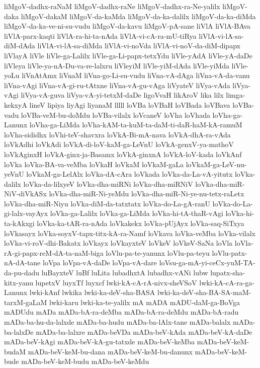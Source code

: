 {liMgoV-dadhx-raNaM
liMgoV-dadhx-raNe
liMgoV-dadhx-ra-Ne-yalilx
liMgoV-daka
liMgoV-dakaM
liMgoV-da-kaMda
liMgoV-da-ka-dalilx
liMgoV-da-ka-diMda
liMgoV-da-ka-ve-ni-su-vudu
liMgoV-da-kavu
liMgoV-pA-sane
liVlA
liVlA-BAva
liVlA-parx-kaqti
liVlA-ra-hi-ta-nAda
liVlA-vi-cA-ra-mU-tiRya
liVlA-vi-lA-sa-diM-dAda
liVlA-vi-lA-sa-diMda
liVlA-vi-noVda
liVlA-vi-noV-da-diM-dipapx
liVlayA
liVle
liVle-ga-Lalilx
liVle-ga-Li-papx-tetxYdu
liVle-yAdA
liVle-yA-daDe
liVleya
liVle-ya-nA-Du-va-re-lalxru
liVleyiM
liVle-yiM-dAda
liVle-yiMda
liVle-yoLu
liVnAtAmx
liVnaM
liVna-go-Li-su-vudu
liVna-vA-dAga
liVna-vA-da-vanu
liVna-vAgi
liVna-vA-gi-ru-tAtxne
liVna-vA-gu-vAga
liVyateV
liVya-vAda
liVya-vAgi
liVya-vA-guva
liVya-vA-yi-tetxM-daDe
ligoVvaH
likAroV
lika
lilx
limga-kekxyA
lineV
lipiya
liyAgi
liyanaM
lllll
loVBa
loVBaH
loVBada
loVBava
loVBa-vadu
loVBa-veM-bu-doMdu
loVBa-vilalx
loVcaneV
loVha
loVhada
loVha-ga-Lanunx
loVha-ga-LiMda
loVha-kAM-ta-kuM-ta-daM-ti-daR-haM-kA-ramuM
loVha-sididhx
loVhi-teV-shavxra
loVkA-Bi-mA-nava
loVkA-dhA-ra-vAda
loVkAdhi
loVkAdi
loVkA-di-loV-kaM-ga-LeVnU
loVkA-genxV-ya-mathoV
loVkAginxH
loVkA-ginx-ja-Basamx
loVkA-ginxnA
loVkA-loV-kada
loVkAnf
loVka
loVka-BA-va-veMba
loVkaH
loVkaM
loVkaM-gaLa
loVkaM-ga-LeV-nu-yeVnU
loVkaM-ga-LelAlx
loVka-dA-cAra
loVkada
loVka-da-La-vA-yitutx
loVka-dalilx
loVka-da-lilxyeV
loVka-dha-miRNi
loVka-dha-miRNiV
loVka-dha-miR-NiV-diVkASx
loVka-dha-miR-Ni-yeMdu
loVka-dha-miR-Ni-ye-nu-tetx-raLetx
loVka-dha-miR-Niyu
loVka-diM-da-tatxtatx
loVka-do-La-gA-ranU
loVka-do-La-gi-lalx-vayAyx
loVka-ga-Lalilx
loVka-ga-LiMda
loVka-hi-tA-thaR-vAgi
loVka-hi-ta-kAkxgi
loVka-ka-tAR-ra-nAda
loVkakekx
loVka-pUjAyx
loVka-saq-SiTxya
loVkasayx
loVka-soyxV-tapx-titx-kA-ra-Namf
loVkava
loVka-veMba
loVka-vilalx
loVka-vi-roV-dhi-Bakatx
loVkayx
loVkayxteV
loVkeV
loVkeV-SaNa
loVla
loVla-rA-gi-papx-reM-dA-ta-naM-biga
loVlu-pa-te-yanunx
loVlu-pa-teyu
loVlu-patx-nA-dA-tane
loVpa
loVpa-vA-daDe
loVpa-vA-dare
loVsu-ga-mA-yi-ceCx-yuM-TA-da-pu-dadu
luBayxteV
luBf
luLita
lubadhxtA
lubadhx-vANi
lubw
lupatx-sha-kitx-yanu
lupetxV
luyxTf
luyxcf
lwki-kA-cA-rA-nivx-sheVSoV
lwki-kA-cA-ra-ga-Lanunx
lwki-kAnf
lwkika
lwki-ka-deV-sha-BASA
lwki-ka-deV-sha-BA-SA-maM-tarxM-gaLaM
lwki-karu
lwki-ka-te-yalilx
mA
mADA
mADU-daM-ga-BoVga
mADUdu
mADa
mADa-bA-ra-deMba
mADa-bA-ra-deMdu
mADa-bA-radu
mADa-ba-hu-da-lalxde
mADa-ba-hudu
mADa-ba-lAlx-tane
mADa-balalx
mADa-ba-lalxDe
mADa-ba-lalxre
mADa-beVDa
mADa-beV-kAda
mADa-beV-kA-daDe
mADa-beV-kAgi
mADa-beV-kA-gu-tatxde
mADa-beV-keMba
mADa-beV-keM-budaM
mADa-beV-keM-bu-dana
mADa-beV-keM-bu-danunx
mADa-beV-keM-bude
mADa-beV-keM-budu
mADa-beV-keMdu
}
